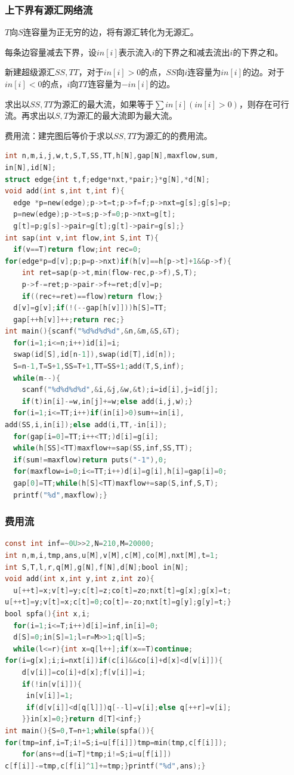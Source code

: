 \documentclass[UTF8,a4paper,titlepage]{ctexart}
\begin{document}
\subsubsection*{上下界有源汇网络流}
$T$向$S$连容量为正无穷的边，将有源汇转化为无源汇。\par
每条边容量减去下界，设$in[i]$表示流入$i$的下界之和减去流出$i$的下界之和。\par
新建超级源汇$SS,TT$，对于$in[i]>0$的点，$SS$向$i$连容量为$in[i]$的边。对于$in[i]<0$的点，$i$向$TT$连容量为$-in[i]$的边。\par
求出以$SS,TT$为源汇的最大流，如果等于$\sum in[i](in[i]>0)$，则存在可行流。再求出以$S,T$为源汇的最大流即为最大流。\par
费用流：建完图后等价于求以$SS,TT$为源汇的的费用流。
\begin{lstlisting}[language=C]
int n,m,i,j,w,t,S,T,SS,TT,h[N],gap[N],maxflow,sum,
in[N],id[N];
struct edge{int t,f;edge*nxt,*pair;}*g[N],*d[N];
void add(int s,int t,int f){
  edge *p=new(edge);p->t=t;p->f=f;p->nxt=g[s];g[s]=p;
  p=new(edge);p->t=s;p->f=0;p->nxt=g[t];
  g[t]=p;g[s]->pair=g[t];g[t]->pair=g[s];}
int sap(int v,int flow,int S,int T){
  if(v==T)return flow;int rec=0;
for(edge*p=d[v];p;p=p->nxt)if(h[v]==h[p->t]+1&&p->f){
    int ret=sap(p->t,min(flow-rec,p->f),S,T);
    p->f-=ret;p->pair->f+=ret;d[v]=p;
    if((rec+=ret)==flow)return flow;}
  d[v]=g[v];if(!(--gap[h[v]]))h[S]=TT;
  gap[++h[v]]++;return rec;}
int main(){scanf("%d%d%d%d",&n,&m,&S,&T);
  for(i=1;i<=n;i++)id[i]=i;
  swap(id[S],id[n-1]),swap(id[T],id[n]);
  S=n-1,T=S+1,SS=T+1,TT=SS+1;add(T,S,inf);
  while(m--){
    scanf("%d%d%d%d",&i,&j,&w,&t);i=id[i],j=id[j];
    if(t)in[i]-=w,in[j]+=w;else add(i,j,w);}
  for(i=1;i<=TT;i++)if(in[i]>0)sum+=in[i],
add(SS,i,in[i]);else add(i,TT,-in[i]);
  for(gap[i=0]=TT;i++<TT;)d[i]=g[i];
  while(h[SS]<TT)maxflow+=sap(SS,inf,SS,TT);
  if(sum!=maxflow)return puts("-1"),0;
  for(maxflow=i=0;i<=TT;i++)d[i]=g[i],h[i]=gap[i]=0;
  gap[0]=TT;while(h[S]<TT)maxflow+=sap(S,inf,S,T);
  printf("%d",maxflow);}
\end{lstlisting}
\subsubsection*{费用流}
\begin{lstlisting}[language=C]
const int inf=~0U>>2,N=210,M=20000;
int n,m,i,tmp,ans,u[M],v[M],c[M],co[M],nxt[M],t=1;
int S,T,l,r,q[M],g[N],f[N],d[N];bool in[N];
void add(int x,int y,int z,int zo){
  u[++t]=x;v[t]=y;c[t]=z;co[t]=zo;nxt[t]=g[x];g[x]=t;
u[++t]=y;v[t]=x;c[t]=0;co[t]=-zo;nxt[t]=g[y];g[y]=t;}
bool spfa(){int x,i;
  for(i=1;i<=T;i++)d[i]=inf,in[i]=0;
  d[S]=0;in[S]=1;l=r=M>>1;q[l]=S;
  while(l<=r){int x=q[l++];if(x==T)continue;
for(i=g[x];i;i=nxt[i])if(c[i]&&co[i]+d[x]<d[v[i]]){
    d[v[i]]=co[i]+d[x];f[v[i]]=i;
    if(!in[v[i]]){
     in[v[i]]=1;
     if(d[v[i]]<d[q[l]])q[--l]=v[i];else q[++r]=v[i];
    }}in[x]=0;}return d[T]<inf;}
int main(){S=0,T=n+1;while(spfa()){
for(tmp=inf,i=T;i!=S;i=u[f[i]])tmp=min(tmp,c[f[i]]);
    for(ans+=d[i=T]*tmp;i!=S;i=u[f[i]])
c[f[i]]-=tmp,c[f[i]^1]+=tmp;}printf("%d",ans);}
\end{lstlisting}
\end{document}
